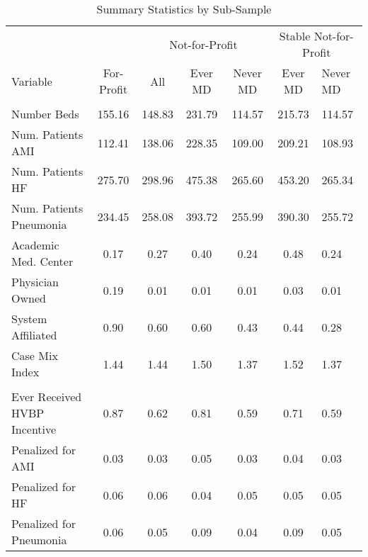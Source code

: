\begin{table}[h]
\centering
\caption{\label{tab:sumstats_samples} Summary Statistics by Sub-Sample}
\centering
\begin{tabular}[t]{lcccccl}
\toprule
\multicolumn{2}{c}{ } & \multicolumn{3}{c}{Not-for-Profit} & \multicolumn{2}{c}{Stable Not-for-Profit} \\
\cmidrule(l{3pt}r{3pt}){3-5} \cmidrule(l{3pt}r{3pt}){6-7}
Variable & For-Profit & All & Ever MD & Never MD & Ever MD & Never MD\\
\midrule
\addlinespace[0.3em]
\multicolumn{7}{l}{\textbf{Hospital Characteristics}}\\
\hspace{1em}Number Beds & 155.16 & 148.83 & 231.79 & 114.57 & 215.73 & 114.57\\
\hspace{1em}Num. Patients AMI & 112.41 & 138.06 & 228.35 & 109.00 & 209.21 & 108.93\\
\hspace{1em}Num. Patients HF & 275.70 & 298.96 & 475.38 & 265.60 & 453.20 & 265.34\\
\hspace{1em}Num. Patients Pneumonia & 234.45 & 258.08 & 393.72 & 255.99 & 390.30 & 255.72\\
\hspace{1em}Academic Med. Center & 0.17 & 0.27 & 0.40 & 0.24 & 0.48 & 0.24\\
\hspace{1em}Physician Owned & 0.19 & 0.01 & 0.01 & 0.01 & 0.03 & 0.01\\
\hspace{1em}System Affiliated & 0.90 & 0.60 & 0.60 & 0.43 & 0.44 & 0.28\\
\hspace{1em}Case Mix Index & 1.44 & 1.44 & 1.50 & 1.37 & 1.52 & 1.37\\
\addlinespace[0.3em]
\multicolumn{7}{l}{\textbf{Penalty/Payment Variables}}\\
\hspace{1em}Ever Received HVBP Incentive & 0.87 & 0.62 & 0.81 & 0.59 & 0.71 & 0.59\\
\hspace{1em}Penalized for AMI & 0.03 & 0.03 & 0.05 & 0.03 & 0.04 & 0.03\\
\hspace{1em}Penalized for HF & 0.06 & 0.06 & 0.04 & 0.05 & 0.05 & 0.05\\
\hspace{1em}Penalized for Pneumonia & 0.06 & 0.05 & 0.09 & 0.04 & 0.09 & 0.05\\

\end{tabular}
\end{table}
